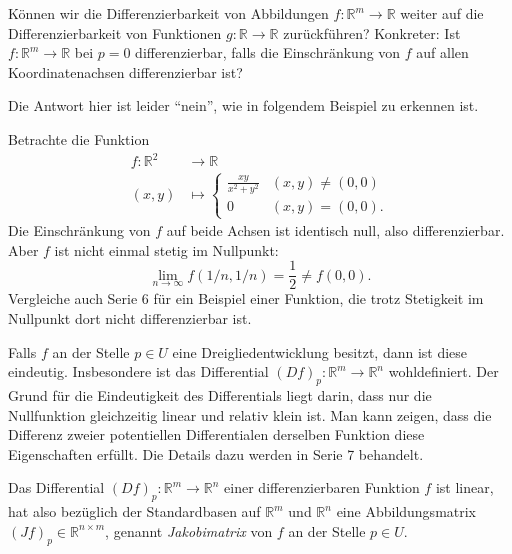 \documentclass[../main.tex]{subfiles}
\begin{document}
\begin{question}
  Können wir die Differenzierbarkeit von Abbildungen
  $f \colon \mathbb{R}^m \to \mathbb{R}$ weiter 
  auf die Differenzierbarkeit von Funktionen
  $g \colon \mathbb{R} \to \mathbb{R}$ zurückführen?
  Konkreter: Ist $f \colon \mathbb{R}^m \to \mathbb{R}$ 
  bei $p = 0$ differenzierbar, falls die Einschränkung
  von $f$ auf allen Koordinatenachsen differenzierbar ist?
\end{question}

Die Antwort hier ist leider ``nein'', wie in folgendem
Beispiel zu erkennen ist.

\begin{example}
  Betrachte die Funktion
  \begin{align*}
    f \colon \mathbb{R}^2 & \to \mathbb{R} \\
    (x, y) & \mapsto 
    \begin{cases}
      \frac{xy}{x^2 + y^2} & (x, y) \neq (0, 0) \\
      0 & (x, y) = (0, 0).
    \end{cases}
  \end{align*}
  Die Einschränkung von $f$ auf beide Achsen ist identisch null,
  also differenzierbar. Aber $f$ ist nicht einmal stetig im Nullpunkt:
  \[
    \lim_{n \to \infty} f(1/n, 1/n) = \frac{1}{2} \neq f(0, 0).
  \]
  Vergleiche auch Serie 6 für ein Beispiel einer Funktion, die
  trotz Stetigkeit im Nullpunkt dort nicht differenzierbar ist.
\end{example}

\begin{remark}
  Falls $f$ an der Stelle $p \in U$ eine
  Dreigliedentwicklung besitzt,
  dann ist diese eindeutig.
  Insbesondere ist das Differential 
  ${(Df)}_p \colon \mathbb{R}^m \to \mathbb{R}^n$ 
  wohldefiniert.
  Der Grund für die Eindeutigkeit des Differentials
  liegt darin, dass nur die Nullfunktion
  gleichzeitig linear und relativ klein ist.
  Man kann zeigen, dass die Differenz
  zweier potentiellen Differentialen derselben Funktion
  diese Eigenschaften erfüllt.
  Die Details dazu werden in Serie 7 behandelt.
\end{remark}

\begin{definition}
  Das Differential ${(Df)}_p \colon \mathbb{R}^m \to \mathbb{R}^n$ 
  einer differenzierbaren Funktion $f$
  ist linear,
  hat also bezüglich der Standardbasen auf
  $\mathbb{R}^m$ und $\mathbb{R}^n$ eine
  Abbildungsmatrix ${(Jf)}_p \in \mathbb{R}^{n \times m}$,
  genannt \emph{Jakobimatrix} von $f$ an der
  Stelle $p \in U$.
\end{definition}
\end{document}
